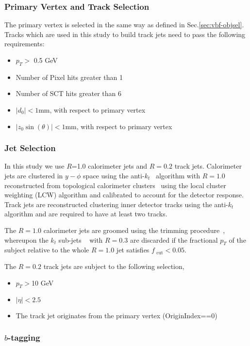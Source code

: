 \label{sec:gbb-obj}

\subsubsection{Primary Vertex and Track Selection}
The primary vertex is selected in the same way as defined in Sec.\ref{sec:vbf-objsel}.
Tracks which are used in this study to build track jets need to pass the following requirements:
\begin{itemize}
    \item $p_T>$ 0.5 GeV
    \item Number of Pixel hits greater than 1
    \item Number of SCT hits greater than 6
    \item $|d_0|<1$mm, with respect to primary vertex
    \item $|z_0\sin(\theta)|<1$mm, with respect to primary vertex
\end{itemize}

\subsubsection{Jet Selection}
In this study we use $R$=1.0 calorimeter jets and $R=0.2$ track jets. Calorimeter jets are clustered in $y-\phi$ space using the anti-$k_t$~\cite{Cacciari:2008gp} algorithm with $R=1.0$ reconstructed from topological calorimeter clusters~\cite{TopoClusters} using the local cluster weighting (LCW) algorithm \cite{EndcapTBelectronPion2002} and calibrated to account for the detector response. Track jets are reconstructed clustering inner detector tracks using the anti-$k_t$ algorithm and are required to have at least two tracks.

\noindent The $R = 1.0$ calorimeter jets are groomed using the trimming procedure~\cite{Krohn:2009th}, whereupon the $k_{t}$ sub-jets ~\cite{Cacciari200657} with $R=0.3$ are discarded if the fractional $p_{T}$ of the subject relative to the whole $R=1.0$ jet satisfies $f_\text{ cut}<0.05$.  

\noindent The $R=0.2$ track jets are subject to the following selection, 
\begin{itemize}
	\item $p_T>$10 GeV
	\item $|\eta|<2.5$	
	\item The track jet originates from the primary vertex (OriginIndex==0)
\end{itemize}

\subsubsection{$b$-tagging}

